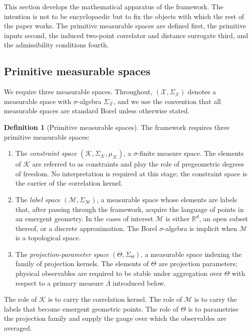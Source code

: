 ﻿\documentclass[12pt,a4paper]{article}
\theoremstyle{definition}
\newtheorem{definition}[theorem]{Definition}
\begin{document}
This section develops the mathematical apparatus of the framework. The intention is not to be encyclopaedic but to fix the objects with which the rest of the paper works. The primitive measurable spaces are defined first, the primitive inputs second, the induced two-point correlator and distance surrogate third, and the admissibility conditions fourth.

\subsection{Primitive measurable spaces}
\label{sec:primitive_spaces}

We require three measurable spaces. Throughout, $(\mathcal{X},\Sigma_{\mathcal{X}})$ denotes a measurable space with $\sigma$-algebra $\Sigma_{\mathcal{X}}$, and we use the convention that all measurable spaces are standard Borel unless otherwise stated.

\begin{definition}[Primitive measurable spaces]
The framework requires three primitive measurable spaces:
\begin{enumerate}
  \item The \emph{constraint space} $(\mathcal{K},\Sigma_{\mathcal{K}},\mu_{\mathcal{K}})$, a $\sigma$-finite measure space. The elements of $\mathcal{K}$ are referred to as constraints and play the role of pregeometric degrees of freedom. No interpretation is required at this stage; the constraint space is the carrier of the correlation kernel.
  \item The \emph{label space} $(\mathcal{M},\Sigma_{\mathcal{M}})$, a measurable space whose elements are labels that, after passing through the framework, acquire the language of points in an emergent geometry. In the cases of interest $\mathcal{M}$ is either $\mathbb{R}^d$, an open subset thereof, or a discrete approximation. The Borel $\sigma$-algebra is implicit when $\mathcal{M}$ is a topological space.
  \item The \emph{projection-parameter space} $(\Theta,\Sigma_\Theta)$, a measurable space indexing the family of projection kernels. The elements of $\Theta$ are projection parameters; physical observables are required to be stable under aggregation over $\Theta$ with respect to a primary measure $\Lambda$ introduced below.
\end{enumerate}
\end{definition}

The role of $\mathcal{K}$ is to carry the correlation kernel. The role of $\mathcal{M}$ is to carry the labels that become emergent geometric points. The role of $\Theta$ is to parametrise the projection family and supply the gauge over which the observables are averaged.
\end{document}
